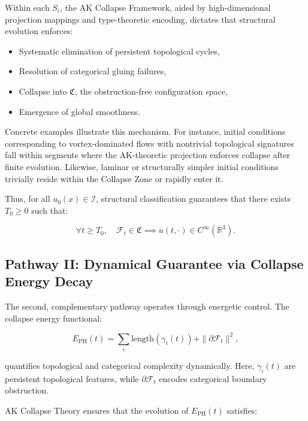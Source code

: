\documentclass[11pt]{article}
\begin{document}
Within each $S_i$, the AK Collapse Framework, aided by high-dimensional projection mappings and type-theoretic encoding, dictates that structural evolution enforces:

\begin{itemize}
  \item Systematic elimination of persistent topological cycles,
  \item Resolution of categorical gluing failures,
  \item Collapse into $\mathfrak{C}$, the obstruction-free configuration space,
  \item Emergence of global smoothness.
\end{itemize}

Concrete examples illustrate this mechanism. For instance, initial conditions corresponding to vortex-dominated flows with nontrivial topological signatures fall within segments where the AK-theoretic projection enforces collapse after finite evolution. Likewise, laminar or structurally simpler initial conditions trivially reside within the Collapse Zone or rapidly enter it.

Thus, for all $u_0(x) \in \mathcal{I}$, structural classification guarantees that there exists $T_0 \geq 0$ such that:

\begin{equation}
\forall t \geq T_0,\quad \mathcal{F}_t \in \mathfrak{C} \implies u(t, \cdot) \in C^\infty(\mathbb{R}^3).
\end{equation}

\subsection{Pathway II: Dynamical Guarantee via Collapse Energy Decay}

The second, complementary pathway operates through energetic control. The collapse energy functional:

\begin{equation}
E_{\mathrm{PH}}(t) = \sum_i \mathrm{length}(\gamma_i(t)) + \|\partial \mathcal{F}_t\|^2,
\end{equation}

quantifies topological and categorical complexity dynamically. Here, $\gamma_i(t)$ are persistent topological features, while $\partial \mathcal{F}_t$ encodes categorical boundary obstruction.

AK Collapse Theory ensures that the evolution of $E_{\mathrm{PH}}(t)$ satisfies:
\end{document}

